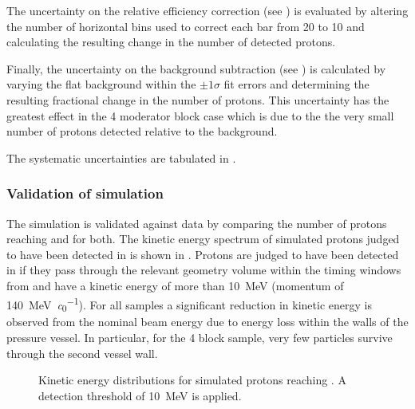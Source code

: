 The uncertainty on the \SFour relative efficiency correction (see ) is evaluated by altering the number of horizontal bins used to correct each bar from 20 to 10 and calculating the resulting change in the number of detected \SFour protons.

Finally, the uncertainty on the \SFour background subtraction (see ) is calculated by varying the flat background within the $\pm 1 \sigma$ fit errors and determining the resulting fractional change in the number of \SFour protons.
This uncertainty has the greatest effect in the 4 moderator block case which is due to the the very small number of protons detected relative to the background.

The systematic uncertainties are tabulated in .

\subsubsection{Validation of simulation}
\label{sec:hptpc_beam_flux:results:MCData:validation}

The simulation is validated against data by comparing the number of protons reaching \SThree and \SFour for both.
The kinetic energy spectrum of simulated protons judged to have been detected in \SFour is shown in .
Protons are judged to have been detected in \SFour if they pass through the relevant geometry volume within the timing windows from  and have a kinetic energy of more than \SI{10}{\mega\electronvolt} (momentum of \SI{140}{\mega\electronvolt\per\clight}).
For all samples a significant reduction in kinetic energy is observed from the nominal beam energy due to energy loss within the walls of the pressure vessel.
In particular, for the 4 block sample, very few particles survive through the second vessel wall.

\begin{figure}[h]
  \begin{adjustbox}{max totalsize=.7\textwidth, center}
    
  \end{adjustbox}
  \caption[Kinetic energy distributions for simulated protons reaching \SFour.]{Kinetic energy distributions for simulated protons reaching \SFour. A detection threshold of \SI{10}{\mega\electronvolt} is applied. }
  \label{fig:protonS4Sim}
\end{figure}

